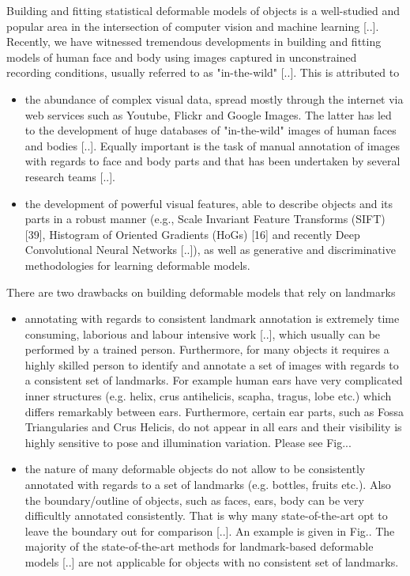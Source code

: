 Building and fitting statistical deformable models of objects is a well-studied and popular area in the intersection of computer vision and machine learning [..]. Recently, we have witnessed tremendous developments in building and fitting models of human face and body using images captured in unconstrained recording conditions, usually referred to as "in-the-wild" [..]. This is attributed to 
\begin{itemize}

\item the abundance of complex visual data, spread mostly through the internet via web services such as Youtube, Flickr and Google Images. The latter has led to the development of huge databases of "in-the-wild" images of human faces and bodies [..]. Equally important is the task of manual annotation of images with regards to face and body parts and that has been undertaken by several research teams [..].

\item the development of powerful visual features, able to describe objects and its parts in a robust manner (e.g., Scale Invariant Feature Transforms (SIFT) [39], Histogram of Oriented Gradients (HoGs) [16] and recently Deep Convolutional Neural Networks [..]), as well as generative and discriminative methodologies for learning deformable models. 

\end{itemize}

There are two drawbacks on building deformable models that rely on landmarks 
\begin{itemize}

\item annotating with regards to consistent landmark annotation is extremely time consuming, laborious and labour intensive work [..], which usually can be performed by a trained person. Furthermore, for many objects it requires a highly skilled person to identify and annotate a set of images with regards to a consistent set of landmarks. For example human ears have very complicated inner structures (e.g. helix, crus antihelicis, scapha, tragus, lobe etc.) which differs remarkably between ears. Furthermore, 
certain ear parts, such as  Fossa Triangularies and Crus Helicis, do not appear in all ears and  their visibility is highly sensitive to pose and illumination variation. Please see Fig... 

\item the nature of many deformable objects do not allow to be consistently annotated with regards to a set of landmarks (e.g. bottles, fruits etc.). Also the boundary/outline of objects, such as faces, ears, body can be very difficultly annotated consistently. That is why many state-of-the-art opt to leave the boundary out for comparison [..]. An example is given in Fig.. The majority of the state-of-the-art methods for landmark-based deformable models [..] are not applicable for objects with no consistent set of landmarks. 

\end{itemize}

